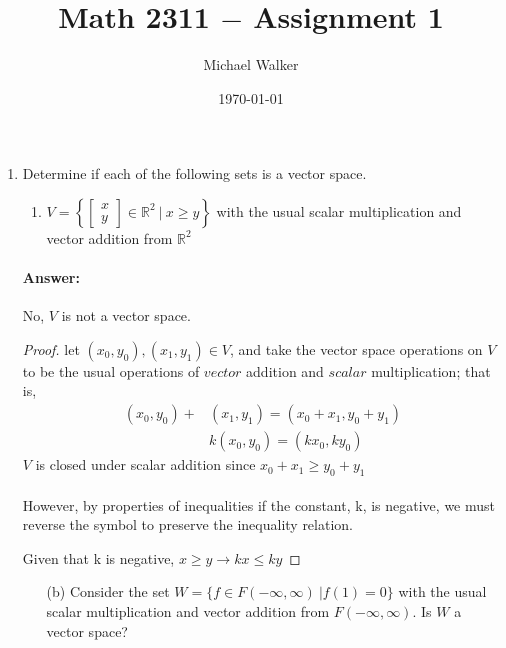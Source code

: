 \documentclass[12pt]{article}
\author{Michael Walker}
\title{Math 2311 $-$ Assignment 1}
\date{\today}
\newcommand{\DS} [1] {${\displaystyle #1}$}
\begin{document}
\maketitle
\begin{enumerate}
        \item
              Determine if each of the following sets is a vector space.
              \begin{enumerate}
                      \item $V=$\DS{ \left\{ \left[ \begin{array}{c}
                                                    x \\
                                                    y
                                            \end{array} \right] \in\mathbb{R}^2 \ | \ x \geq{y} \right\}}
                            with the usual scalar multiplication
                            and vector addition from $\mathbb{R}^2$
              \end{enumerate}
              \paragraph{Answer:} No, $V$ is not a vector space.
              \begin{proof}
                      let $({x_0}, {y_0}), ({x_1}, {y_1}) \in V$,
                      and take the vector space operations on $V$
                      to be the usual operations of $vector$
                      addition and $scalar$ multiplication; that is,
                      \begin{align}
                              ({x_0}, {y_0})+ & ({x_1}, {y_1}) =({x_0}+{x_1}, {y_0}+{y_1}) \\
                                              & k({x_0}, {y_0}) = ({kx_0}, {ky_0})
                      \end{align}
                      $V$ is closed under scalar addition since ${x_0 + x_1} \ge {y_0 + y_1}$ \\\\
                      However, by properties of inequalities if the constant,
                      k, is negative, we must reverse the symbol to preserve the inequality relation.

                      Given that k is negative, ${x\geq y} \rightarrow {kx\leq ky}$
              \end{proof}
              \pagebreak
              \begin{enumerate}
                      \item[(b)] Consider the set $W = \{f \in F(-\infty, \infty) \ | f(1) = 0\}$
                            with the usual scalar multiplication and vector addition from
                            $F(-\infty, \infty)$.
                            Is $W$ a vector space?
              \end{enumerate}

\end{enumerate}
\end{document}
